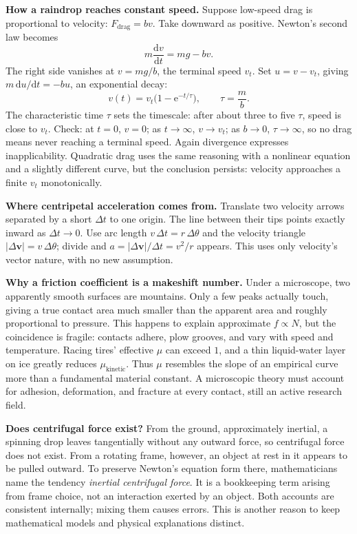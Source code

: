 \begin{mathbridge}
\textbf{How a raindrop reaches constant speed.} Suppose low-speed drag is proportional to velocity: \(F_{\text{drag}}=bv\). Take downward as positive. Newton's second law becomes
\[
m\frac{\mathrm dv}{\mathrm dt}=mg-bv .
\]
The right side vanishes at \(v=mg/b\), the terminal speed \(v_t\). Set \(u=v-v_t\), giving \(m\,\mathrm du/\mathrm dt=-bu\), an exponential decay:
\[
v(t)=v_t\bigl(1-\mathrm e^{-t/\tau}\bigr),\qquad \tau=\frac{m}{b}.
\]
The characteristic time \(\tau\) sets the timescale: after about three to five \(\tau\), speed is close to \(v_t\). Check: at \(t=0\), \(v=0\); as \(t\to\infty\), \(v\to v_t\); as \(b\to0\), \(\tau\to\infty\), so no drag means never reaching a terminal speed. Again divergence expresses inapplicability. Quadratic drag uses the same reasoning with a nonlinear equation and a slightly different curve, but the conclusion persists: velocity approaches a finite \(v_t\) monotonically.

\textbf{Where centripetal acceleration comes from.} Translate two velocity arrows separated by a short \(\Delta t\) to one origin. The line between their tips points exactly inward as \(\Delta t\to0\). Use arc length \(v\,\Delta t=r\,\Delta\theta\) and the velocity triangle \(|\Delta\bm v|=v\,\Delta\theta\); divide and \(a=|\Delta\bm v|/\Delta t=v^2/r\) appears. This uses only velocity's vector nature, with no new assumption.
\end{mathbridge}

\begin{challenge}
\textbf{Why a friction coefficient is a makeshift number.} Under a microscope, two apparently smooth surfaces are mountains. Only a few peaks actually touch, giving a true contact area much smaller than the apparent area and roughly proportional to pressure. This happens to explain approximate \(f\propto N\), but the coincidence is fragile: contacts adhere, plow grooves, and vary with speed and temperature. Racing tires' effective \(\mu\) can exceed \(1\), and a thin liquid-water layer on ice greatly reduces \(\mu_{\text{kinetic}}\). Thus \(\mu\) resembles the slope of an empirical curve more than a fundamental material constant. A microscopic theory must account for adhesion, deformation, and fracture at every contact, still an active research field.

\textbf{Does centrifugal force exist?} From the ground, approximately inertial, a spinning drop leaves tangentially without any outward force, so centrifugal force does not exist. From a rotating frame, however, an object at rest in it appears to be pulled outward. To preserve Newton's equation form there, mathematicians name the tendency \emph{inertial centrifugal force}. It is a bookkeeping term arising from frame choice, not an interaction exerted by an object. Both accounts are consistent internally; mixing them causes errors. This is another reason to keep mathematical models and physical explanations distinct.
\end{challenge}

